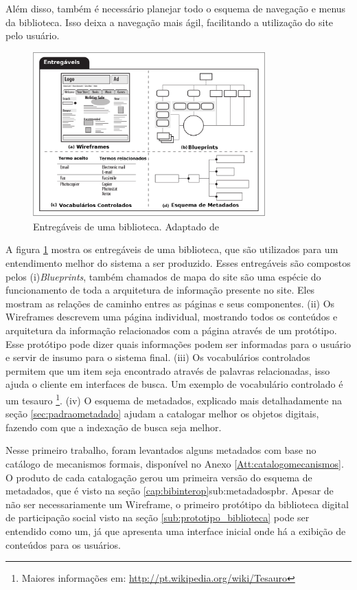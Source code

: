 Além disso, também é necessário planejar todo o esquema de navegação e menus da biblioteca. Isso deixa a navegação mais ágil, facilitando a utilização do site pelo usuário.

\graphicspath{{figuras/}}
\begin{figure}[H]
\centering
\includegraphics[width=0.8\textwidth]{entregaveis}
\caption[Entregáveis de uma biblioteca]{Entregáveis de uma biblioteca. Adaptado de \cite{rosenfeld2002information}}
\label{fig:entregaveissoftware}
\end{figure}

A figura \ref{fig:entregaveissoftware} mostra os entregáveis de uma biblioteca, que são utilizados para um entendimento melhor do sistema a ser produzido. Esses entregáveis são compostos pelos (i)\textit{Blueprints}, também chamados de mapa do site são uma espécie do funcionamento de toda a arquitetura de informação presente no site. Eles mostram as relações de caminho entres as páginas e seus componentes. (ii) Os Wireframes descrevem uma página individual, mostrando todos os conteúdos e arquitetura da informação relacionados com a página através de um protótipo. Esse protótipo pode dizer quais informações podem ser informadas para o usuário e servir de insumo para o sistema final. (iii) Os vocabulários controlados permitem que um item seja encontrado através de palavras relacionadas, isso ajuda o cliente em interfaces de busca. Um exemplo de vocabulário controlado é um tesauro \footnote{Maiores informações em: \url{http://pt.wikipedia.org/wiki/Tesauro}}. (iv) O esquema de metadados, explicado mais detalhadamente na seção \ref{sec:padraometadado} ajudam a catalogar melhor os objetos digitais, fazendo com que a indexação de busca seja melhor.

Nesse primeiro trabalho, foram levantados alguns metadados com base no catálogo de mecanismos formais, disponível no Anexo \ref{Att:catalogomecanismos}. O produto de cada catalogação gerou um primeira versão do esquema de metadados, que é visto na seção \ref{cap:bibinterop}{sub:metadadospbr}. Apesar de não ser necessariamente um Wireframe, o primeiro protótipo da biblioteca digital de participação social visto na seção \ref{sub:prototipo_biblioteca} pode ser entendido como um, já que apresenta uma interface inicial onde há a exibição de conteúdos para os usuários.

